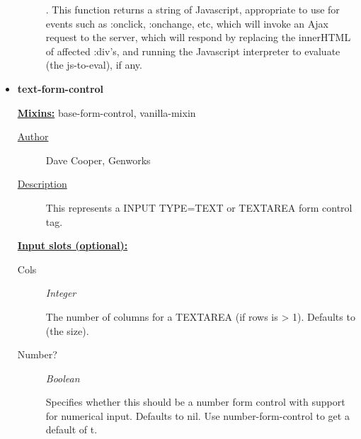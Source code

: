 \documentclass [11pt]{book}
\begin{document}
\begin{itemize}
\begin{description}
.
This function returns a string of Javascript, appropriate to use for events
such as :onclick, :onchange, etc, which will invoke an Ajax request to the
server, which will respond by replacing the innerHTML of affected :div's, and
running the Javascript interpreter to evaluate (the js-to-eval), if any.




\end{description}







\item {}
\label{prim:text-form-control}
\textbf{text-form-control}


\textbf{
\underline{Mixins:}} base-form-control, vanilla-mixin





\begin{description}

\item [
\underline{Author}]


Dave Cooper, Genworks



\item [
\underline{Description}]


This represents a INPUT TYPE=TEXT or TEXTAREA form control tag.



\end{description}








\textbf{
\underline{Input slots (optional):}}

\begin{description}

\item [Cols]
\emph{Integer}

 The number of columns for a TEXTAREA (if rows is > 1). Defaults to (the size).




\item [Number?]
\emph{Boolean}

 Specifies whether this should be a number form control with support for numerical input.
Defaults to nil. Use number-form-control to get a default of t.





\end{description}
\end{itemize}
\end{document}
